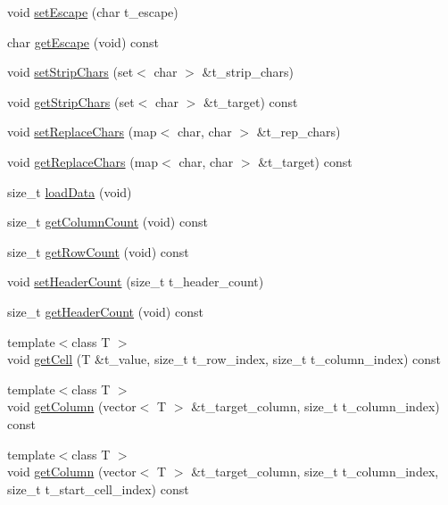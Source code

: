 \begin{DoxyCompactItemize}
void \hyperlink{classutils_1_1SlightCSV_a6673b7489c55fe9613f0ebd5dce19da4}{set\+Escape} (char t\+\_\+escape)
\item 
char \hyperlink{classutils_1_1SlightCSV_ab821a07daafa1ccaf8468ac485b226b0}{get\+Escape} (void) const
\item 
void \hyperlink{classutils_1_1SlightCSV_a8a1d201855747b4c1207ecef5ac1e2b5}{set\+Strip\+Chars} (set$<$ char $>$ \&t\+\_\+strip\+\_\+chars)
\item 
void \hyperlink{classutils_1_1SlightCSV_a13d435b5e07c827f6688efa9bf4673d4}{get\+Strip\+Chars} (set$<$ char $>$ \&t\+\_\+target) const
\item 
void \hyperlink{classutils_1_1SlightCSV_a9f7c4e3d88da03440d01b926b1fc3447}{set\+Replace\+Chars} (map$<$ char, char $>$ \&t\+\_\+rep\+\_\+chars)
\item 
void \hyperlink{classutils_1_1SlightCSV_aa28076f9867ef095802adbe0d8f966fb}{get\+Replace\+Chars} (map$<$ char, char $>$ \&t\+\_\+target) const
\item 
size\+\_\+t \hyperlink{classutils_1_1SlightCSV_adea079ec76c9ee67d096f8fd39946380}{load\+Data} (void)
\item 
size\+\_\+t \hyperlink{classutils_1_1SlightCSV_a5dcd159ef127b63942bce5498beb8dae}{get\+Column\+Count} (void) const
\item 
size\+\_\+t \hyperlink{classutils_1_1SlightCSV_a5286060190553fe7eceb973bba22ae22}{get\+Row\+Count} (void) const
\item 
void \hyperlink{classutils_1_1SlightCSV_a3d704d8bbce22b1731e383db4fc96429}{set\+Header\+Count} (size\+\_\+t t\+\_\+header\+\_\+count)
\item 
size\+\_\+t \hyperlink{classutils_1_1SlightCSV_a781ae99927f2b8d704add6a2a53e0051}{get\+Header\+Count} (void) const
\item 
{\footnotesize template$<$class T $>$ }\\void \hyperlink{classutils_1_1SlightCSV_a916d9b0b7faedc7c9af20e475c4b4cb6}{get\+Cell} (T \&t\+\_\+value, size\+\_\+t t\+\_\+row\+\_\+index, size\+\_\+t t\+\_\+column\+\_\+index) const
\item 
{\footnotesize template$<$class T $>$ }\\void \hyperlink{classutils_1_1SlightCSV_a56b9814d42283eb075bcfe3a9ca887e7}{get\+Column} (vector$<$ T $>$ \&t\+\_\+target\+\_\+column, size\+\_\+t t\+\_\+column\+\_\+index) const
\item 
{\footnotesize template$<$class T $>$ }\\void \hyperlink{classutils_1_1SlightCSV_a31db986196c89fa8b5b4f119fe548b0b}{get\+Column} (vector$<$ T $>$ \&t\+\_\+target\+\_\+column, size\+\_\+t t\+\_\+column\+\_\+index, size\+\_\+t t\+\_\+start\+\_\+cell\+\_\+index) const

\end{DoxyCompactItemize}
